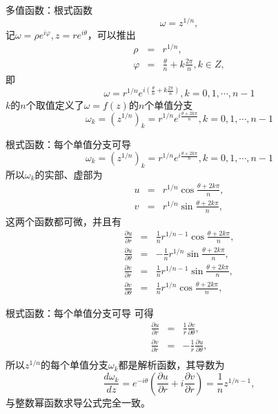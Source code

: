 \documentclass[11pt]{beamer}
\begin{document}
\begin{frame}{多值函数：根式函数}
\begin{equation}
\omega = z^{1/n},
\end{equation}
记$\omega = \rho e^{i\varphi}, z = re^{i\theta}$，可以推出
\begin{eqnarray}
\rho &=& r^{1/n}, \\
\varphi &=& \frac{\theta}{n} + k \frac{2\pi}{n}, k \in Z,
\end{eqnarray}
即
\begin{equation}
\omega = r^{1/n} e^{i (\frac{\theta}{n} + k \frac{2\pi}{n}) },
k = 0, 1, \cdots, n-1
\end{equation}
$k$的$n$个取值定义了$\omega = f(z)$的$n$个{\color{blue}单值分支}
\begin{equation}
\omega_k = (z^{1/n})_k = r^{1/n} e^{i\frac{\theta + 2k\pi}{n}}, k = 0,1,\cdots,n-1
\end{equation}
\end{frame}

\begin{frame}{根式函数：每个单值分支可导}
\begin{equation}
\omega_k = (z^{1/n})_k = r^{1/n} e^{i\frac{\theta + 2k\pi}{n}}, k = 0,1,\cdots,n-1
\end{equation}
所以$\omega_k$的实部、虚部为
\begin{eqnarray}
u &=& r^{1/n} \cos \frac{\theta + 2k\pi}{n}, \\
v &=& r^{1/n} \sin \frac{\theta + 2k\pi}{n},
\end{eqnarray}
这两个函数都可微，并且有
\begin{eqnarray}
\frac{\partial u}{\partial r} &=& \frac{1}{n} r^{1/n -1} \cos \frac{ \theta + 2k\pi}{n}, \\
\frac{\partial u}{\partial \theta} &=& - \frac{1}{n} r^{1/n} \sin \frac{ \theta + 2k\pi}{n}, \\
\frac{\partial v}{\partial r} &=& \frac{1}{n} r^{1/n -1} \sin \frac{ \theta + 2k\pi}{n}, \\
\frac{\partial v}{\partial \theta} &=& \frac{1}{n} r^{1/n} \cos \frac{ \theta + 2k\pi}{n}, 
\end{eqnarray}
\end{frame}

\begin{frame}{根式函数：每个单值分支可导}
可得
\begin{eqnarray}
\frac{\partial u}{\partial r} &=& \frac{1}{r} \frac{\partial v}{\partial \theta}, \\
\frac{\partial v}{\partial r} &=& - \frac{1}{r} \frac{\partial u}{\partial \theta}, \\
\end{eqnarray}
所以$z^{1/n}$的每个单值分支$\omega_k$都是解析函数，其导数为
\begin{equation}
\frac{d \omega_k}{d z} = e^{-i\theta}(\frac{\partial u}{\partial r} + i \frac{\partial v}{\partial r}) = \frac{1}{n}z^{1/n -1 },
\end{equation}
与整数幂函数求导公式完全一致。
\end{frame}
\end{document}
